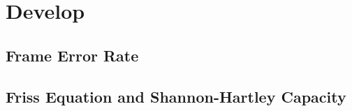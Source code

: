 \section{Develop}



\subsection{Frame Error Rate}
\subsection{Friss Equation and Shannon-Hartley Capacity}
